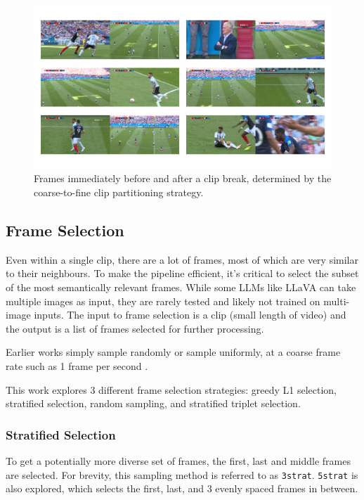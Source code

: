 \begin{figure}
      \centering
      \includegraphics[width=\textwidth]{figures/breaks.png}
      \caption{Frames immediately before and after a clip break, determined by the coarse-to-fine clip partitioning strategy.}
      \label{fig:breaks}
\end{figure}


\subsection{Frame Selection}

Even within a single clip, there are a lot of frames, most of which are very similar to their neighbours.
To make the pipeline efficient, it's critical to select the subset of the most semantically relevant frames.
While some LLMs like LLaVA can take multiple images as input, they are rarely tested and likely not trained on multi-image inputs.
The input to frame selection is a clip (small length of video) and the output is a list of frames selected for further processing.

Earlier works simply sample randomly \cite{clipbert} or sample uniformly, at a coarse frame rate such as 1 frame per second \cite{clip4clip}.

This work explores 3 different frame selection strategies:
greedy L1 selection, stratified selection, random sampling, and stratified triplet selection.

\subsubsection{Stratified Selection}
To get a potentially more diverse set of frames, the first, last and middle frames are selected.
For brevity, this sampling method is referred to as \verb|3strat|. \verb|5strat| is also explored, which selects the first, last, and 3 evenly spaced frames in between.

